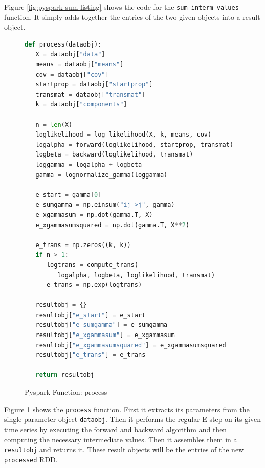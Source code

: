 Figure \ref{fig:pyspark-sum-listing} shows the code for the \texttt{sum\_interm\_values} function. It simply adds together the entries of the two given objects into a result object. 

\begin{figure}
\begin{singlespace}
\begin{lstlisting}[language=Python]
def process(dataobj):
   X = dataobj["data"]
   means = dataobj["means"]
   cov = dataobj["cov"]
   startprop = dataobj["startprop"]
   transmat = dataobj["transmat"]
   k = dataobj["components"]

   n = len(X)
   loglikelihood = log_likelihood(X, k, means, cov)
   logalpha = forward(loglikelihood, startprop, transmat)
   logbeta = backward(loglikelihood, transmat)
   loggamma = logalpha + logbeta
   gamma = lognormalize_gamma(loggamma)

   e_start = gamma[0]
   e_sumgamma = np.einsum("ij->j", gamma)
   e_xgammasum = np.dot(gamma.T, X)
   e_xgammasumsquared = np.dot(gamma.T, X**2)

   e_trans = np.zeros((k, k))
   if n > 1:
      logtrans = compute_trans(
         logalpha, logbeta, loglikelihood, transmat)
      e_trans = np.exp(logtrans)

   resultobj = {}
   resultobj["e_start"] = e_start
   resultobj["e_sumgamma"] = e_sumgamma
   resultobj["e_xgammasum"] = e_xgammasum
   resultobj["e_xgammasumsquared"] = e_xgammasumsquared
   resultobj["e_trans"] = e_trans

   return resultobj
\end{lstlisting}
\end{singlespace}
\caption{Pyspark Function: process}    
\label{fig:pyspark-process-listing}
\end{figure}

Figure \ref{fig:pyspark-process-listing} shows the \texttt{process} function. First it extracts its parameters from the single parameter object \texttt{dataobj}. Then it performs the regular E-step on its given time series by executing the forward and backward algorithm and then computing the necessary intermediate values. Then it assembles them in a \texttt{resultobj} and returns it. These result objects will be the entries of the new \texttt{processed} RDD.